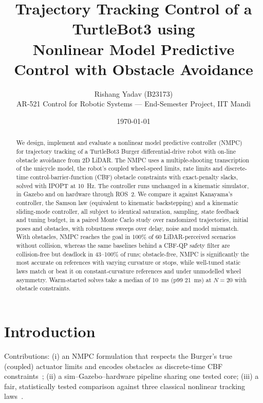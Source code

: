 \documentclass[11pt,a4paper]{article}
\title{Trajectory Tracking Control of a TurtleBot3 using\\Nonlinear Model Predictive Control with Obstacle Avoidance}
\author{Rishang Yadav (B23173)\\AR-521 Control for Robotic Systems --- End-Semester Project, IIT Mandi}
\date{\today}
\begin{document}
\maketitle

\begin{abstract}
We design, implement and evaluate a nonlinear model predictive controller (NMPC) for trajectory tracking of a TurtleBot3 Burger differential-drive robot with on-line obstacle avoidance from 2D LiDAR. The NMPC uses a multiple-shooting transcription of the unicycle model, the robot's coupled wheel-speed limits, rate limits and discrete-time control-barrier-function (CBF) obstacle constraints with exact-penalty slacks, solved with IPOPT at \SI{10}{Hz}. The controller runs unchanged in a kinematic simulator, in Gazebo and on hardware through ROS~2. We compare it against Kanayama's controller, the Samson law (equivalent to kinematic backstepping) and a kinematic sliding-mode controller, all subject to identical saturation, sampling, state feedback and tuning budget, in a paired Monte Carlo study over randomized trajectories, initial poses and obstacles, with robustness sweeps over delay, noise and model mismatch. With obstacles, NMPC reaches the goal in 100\% of 60 LiDAR-perceived scenarios without collision, whereas the same baselines behind a CBF-QP safety filter are collision-free but deadlock in 43--100\% of runs; obstacle-free, NMPC is significantly the most accurate on references with varying curvature or stops, while well-tuned static laws match or beat it on constant-curvature references and under unmodelled wheel asymmetry. Warm-started solves take a median of \SI{10}{ms} (p99 \SI{21}{ms}) at $N=20$ with obstacle constraints.
\end{abstract}

\section{Introduction}
Contributions: (i) an NMPC formulation that respects the Burger's true (coupled) actuator limits and encodes obstacles as discrete-time CBF constraints~\cite{zeng2021mpccbf}; (ii) a sim--Gazebo--hardware pipeline sharing one tested core; (iii) a fair, statistically tested comparison against three classical nonlinear tracking laws~\cite{kanayama1990,samson1995,elyoussef2014}.
\end{document}
